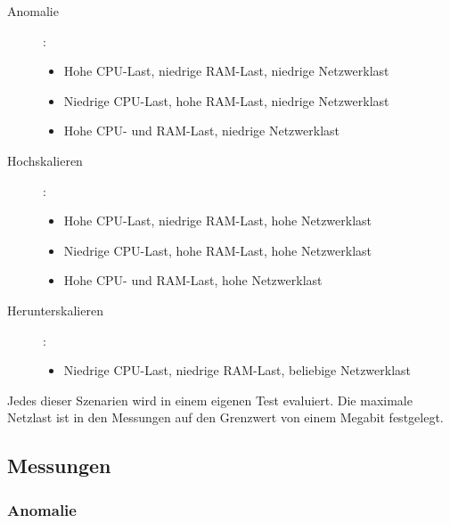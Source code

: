\documentclass[a4paper,10pt]{scrartcl}
\begin{document}
\begin{description}
\item[Anomalie]:
\begin{itemize}
\item Hohe CPU-Last, niedrige RAM-Last, niedrige Netzwerklast
\item Niedrige CPU-Last, hohe RAM-Last, niedrige Netzwerklast
\item Hohe CPU- und RAM-Last, niedrige Netzwerklast
\end{itemize}
\item[Hochskalieren]:
\begin{itemize}
\item Hohe CPU-Last, niedrige RAM-Last, hohe Netzwerklast
\item Niedrige CPU-Last, hohe RAM-Last, hohe Netzwerklast
\item Hohe CPU- und RAM-Last, hohe Netzwerklast
\end{itemize}
\item[Herunterskalieren]:
\begin{itemize}
\item Niedrige CPU-Last, niedrige RAM-Last, beliebige Netzwerklast
\end{itemize}
\end{description}

Jedes dieser Szenarien wird in einem eigenen Test evaluiert.
Die maximale Netzlast ist in den Messungen auf den Grenzwert von einem Megabit festgelegt.

\subsection{Messungen}

\subsubsection{Anomalie}
\end{document}
